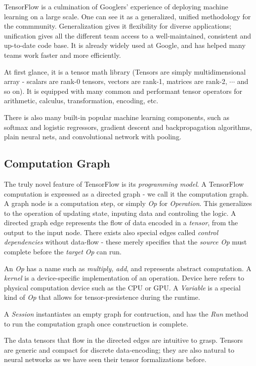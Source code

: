 \documentclass[12pt]{article}  %
\begin{document}
TensorFlow is a culmination of Googlers' experience of deploying machine learning on a large scale. One can see it as a generalized, unified methodology for the commmunity. Generalization gives it flexibility for diverse applications; unification gives all the different team access to a well-maintained, consistent and up-to-date code base. It is already widely used at Google, and has helped many teams work faster and more efficiently.

At first glance, it is a tensor math library (Tensors are simply multidimensional array - scalars are rank-0 tensors, vectors are rank-1, matrices are rank-2, $\cdots$ and so on). It is equipped with many common and performant tensor operators for arithmetic, calculus, transformation, encoding, etc.

There is also many built-in popular machine learning components, such as softmax and logistic regressors, gradient descent and backpropagation algorithms, plain neural nets, and convolutional network with pooling.

\subsection{Computation Graph}

The truly novel feature of TensorFlow is its \emph{programming model}. A TensorFlow computation is expressed as a directed graph - we call it the computation graph. A graph node is a computation step, or simply \emph{Op} for \emph{Operation}. This generalizes to the operation of updating state, inputing data and controling the logic. A directed graph edge represents the flow of data encoded in a \emph{tensor}, from the output to the input node. There exists also special edges called \emph{control dependencies} without data-flow - these merely specifies that the \emph{source Op} must complete before the \emph{target Op} can run.

An \emph{Op} has a name such as \emph{multiply, add}, and represents abstract computation. A \emph{kernel} is a device-specific implementation of an operation. Device here refers to physical computation device such as the CPU or GPU. A \emph{Variable} is a special kind of \emph{Op} that allows for tensor-presistence during the runtime.

A \emph{Session} instantiates an empty graph for contruction, and has the \emph{Run} method to run the computation graph once construction is complete.

The data tensors that flow in the directed edges are intuitive to grasp. Tensors are generic and compact for discrete data-encoding; they are also natural to neural networks as we have seen their tensor formalizations before.
\end{document}
